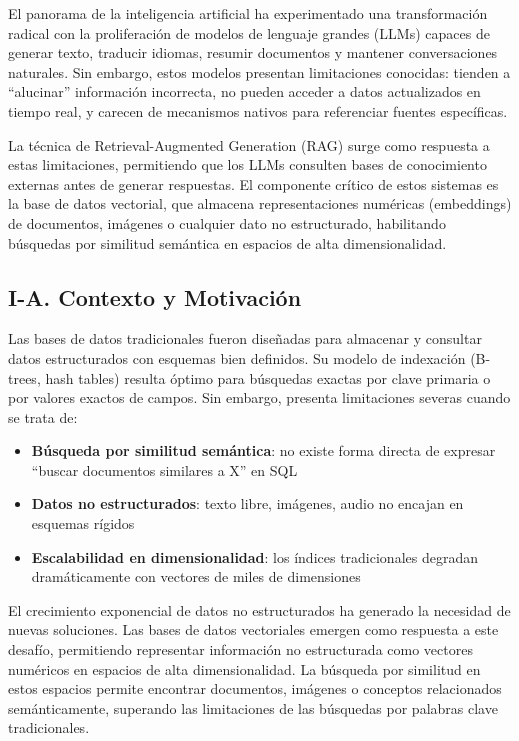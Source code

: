 \documentclass[conference]{IEEEtran}
\begin{document}
El panorama de la inteligencia artificial ha experimentado una transformación radical con la proliferación de modelos de lenguaje grandes (LLMs) capaces de generar texto, traducir idiomas, resumir documentos y mantener conversaciones naturales. Sin embargo, estos modelos presentan limitaciones conocidas: tienden a ``alucinar'' información incorrecta, no pueden acceder a datos actualizados en tiempo real, y carecen de mecanismos nativos para referenciar fuentes específicas.

La técnica de Retrieval-Augmented Generation (RAG) surge como respuesta a estas limitaciones, permitiendo que los LLMs consulten bases de conocimiento externas antes de generar respuestas. El componente crítico de estos sistemas es la base de datos vectorial, que almacena representaciones numéricas (embeddings) de documentos, imágenes o cualquier dato no estructurado, habilitando búsquedas por similitud semántica en espacios de alta dimensionalidad.

\subsection{I-A. Contexto y Motivación}

Las bases de datos tradicionales fueron diseñadas para almacenar y consultar datos estructurados con esquemas bien definidos. Su modelo de indexación (B-trees, hash tables) resulta óptimo para búsquedas exactas por clave primaria o por valores exactos de campos. Sin embargo, presenta limitaciones severas cuando se trata de:

\begin{itemize}
    \item \textbf{Búsqueda por similitud semántica}: no existe forma directa de expresar ``buscar documentos similares a X'' en SQL
    \item \textbf{Datos no estructurados}: texto libre, imágenes, audio no encajan en esquemas rígidos
    \item \textbf{Escalabilidad en dimensionalidad}: los índices tradicionales degradan dramáticamente con vectores de miles de dimensiones
\end{itemize}

El crecimiento exponencial de datos no estructurados ha generado la necesidad de nuevas soluciones. Las bases de datos vectoriales emergen como respuesta a este desafío, permitiendo representar información no estructurada como vectores numéricos en espacios de alta dimensionalidad. La búsqueda por similitud en estos espacios permite encontrar documentos, imágenes o conceptos relacionados semánticamente, superando las limitaciones de las búsquedas por palabras clave tradicionales.
\end{document}
